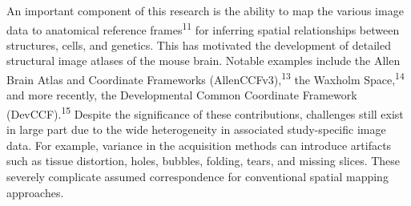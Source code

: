 \documentclass[
  12pt,
]{article}
\begin{document}
An important component of this research is the ability to map the
various image data to anatomical reference frames\textsuperscript{11}
for inferring spatial relationships between structures, cells, and
genetics. This has motivated the development of detailed structural
image atlases of the mouse brain. Notable examples include the Allen
Brain Atlas and Coordinate Frameworks (AllenCCFv3),\textsuperscript{13}
the Waxholm Space,\textsuperscript{14} and more recently, the
Developmental Common Coordinate Framework (DevCCF).\textsuperscript{15}
Despite the significance of these contributions, challenges still exist
in large part due to the wide heterogeneity in associated study-specific
image data. For example, variance in the acquisition methods can
introduce artifacts such as tissue distortion, holes, bubbles, folding,
tears, and missing slices. These severely complicate assumed
correspondence for conventional spatial mapping approaches.
\end{document}
